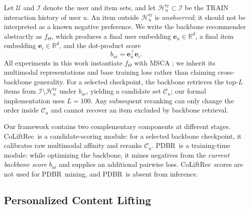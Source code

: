\documentclass[sigconf,anonymous,review]{acmart}
\newcommand{\methodname}{CoLiftRec}
\newcommand{\pdbr}{PDBR}
\begin{document}
Let $\mathcal{U}$ and $\mathcal{I}$ denote the user and item sets, and let $\mathcal{H}^{\mathrm{tr}}_u\subset\mathcal{I}$ be the TRAIN interaction history of user $u$.
An item outside $\mathcal{H}^{\mathrm{tr}}_u$ is \emph{unobserved}; it should not be interpreted as a known negative preference.
We write the backbone recommender abstractly as $f_{\Theta}$, which produces a final user embedding $\mathbf{e}_u\in\mathbb{R}^d$, a final item embedding $\mathbf{e}_i\in\mathbb{R}^d$, and the dot-product score
\begin{equation}
    b_{ui}=\mathbf{e}_u^{\top}\mathbf{e}_i.
\end{equation}
All experiments in this work instantiate $f_{\Theta}$ with MSCA \cite{li2026msca}; we inherit its multimodal representations and base training loss rather than claiming cross-backbone generality.
For a selected checkpoint, the backbone retrieves the top-$L$ items from $\mathcal{I}\setminus\mathcal{H}^{\mathrm{tr}}_u$ under $b_{ui}$, yielding a candidate set $\mathcal{C}_u$; our formal implementation uses $L=100$.
Any subsequent reranking can only change the order inside $\mathcal{C}_u$ and cannot recover an item excluded by backbone retrieval.

Our framework contains two complementary components at different stages.
\methodname\ is a candidate-scoring module: for a selected backbone checkpoint, it calibrates raw multimodal affinity and reranks $\mathcal{C}_u$.
\pdbr\ is a training-time module: while optimizing the backbone, it mines negatives from the \emph{current backbone score} $b_{ui}$ and supplies an additional pairwise loss.
\methodname\ scores are not used for \pdbr\ mining, and \pdbr\ is absent from inference.


\subsection{Personalized Content Lifting}
\label{sec:colift}
\end{document}
